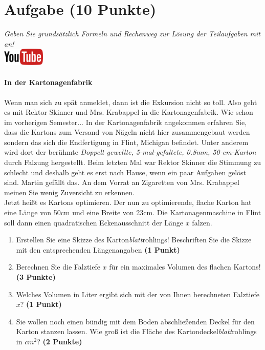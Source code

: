 \documentclass[a4paper, 9pt]{scrartcl}\usepackage[]{graphicx}\usepackage[]{xcolor}
\begin{document}
 
\clearpage

\section{Aufgabe \hfill (10 Punkte)}

\textit{Geben Sie grunds{\"a}tzlich Formeln und Rechenweg zur L{\"o}sung der
  Teilaufgaben mit an!} \\[1Ex]

\hfill\href{https://youtu.be/RuzMjwvwT-4}{\includegraphics[width =
  2cm]{img/youtube}} %
\hspace{2Ex}

\paragraph{In der Kartonagenfabrik}



Wenn man sich zu sp{\"a}t anmeldet, dann ist die Exkursion nicht so toll. Also
geht es mit Rektor Skinner und Mrs. Krabappel in die Kartonagenfabrik. Wie
schon im vorherigen Semester... In der Kartonagenfabrik angekommen erfahren
Sie, dass die Kartons zum Versand von N{\"a}geln nicht hier zusammengebaut
werden sondern das sich die Endfertigung in Flint, Michigan befindet. Unter
anderem wird dort der ber{\"u}hmte \textit{Doppelt gewellte,
  5-mal-gefaltete, 0.8mm, 50-cm-Karton} durch
Falzung hergestellt. Beim letzten Mal war Rektor Skinner die Stimmung zu
schlecht und deshalb geht es erst nach Hause, wenn ein paar Aufgaben gel{\"o}st
sind. Martin gef{\"a}llt das. An dem Vorrat
an Zigaretten von Mrs. Krabappel meinen Sie wenig Zuversicht zu erkennen.\\

Jetzt hei{\ss}t es Kartons optimieren. Der nun zu optimierende, flache Karton
hat eine L{\"a}nge von 50cm und eine Breite von 23cm. Die
Kartonagenmaschine in Flint soll dann einen quadratischen Eckenausschnitt
der L{\"a}nge $x$ falzen.

\begin{enumerate}
\item Erstellen Sie eine Skizze des Karton\textit{blatt}rohlings!
  Beschriften Sie die Skizze mit den entsprechenden L{\"a}ngenangaben
  \textbf{(1 Punkt)}
\item Berechnen Sie die Falztiefe $x$ f{\"u}r ein maximales Volumen des flachen
  Kartons! \textbf{(3 Punkte)}
\item Welches Volumen in Liter ergibt sich mit der von Ihnen berechneten
  Falztiefe $x$?  \textbf{(1 Punkt)}
\item Sie wollen noch einen b{\"u}ndig mit dem Boden abschlie{\ss}enden Deckel f{\"u}r
  den Karton stanzen lassen. Wie gro{\ss} ist die Fl{\"a}che des
  Kartondeckel\textit{blatt}rohlings in $cm^2$? \textbf{(2 Punkte)}
\end{enumerate}
\end{document}
